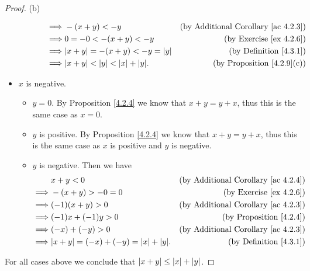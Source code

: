 \begin{proof}{(b)}
\begin{itemize}
\begin{itemize}
\begin{itemize}
\begin{align*}
                                      \implies & -(x + y) < -y                              & \text{(by Additional Corollary \ref{ac 4.2.3})} \\
                                      \implies & 0 = -0 < -(x + y) < -y                     & \text{(by Exercise \ref{ex 4.2.6})}             \\
                                      \implies & \abs{x + y} = -(x + y) < -y = \abs{y}      & \text{(by Definition \ref{4.3.1})}              \\
                                      \implies & \abs{x + y} < \abs{y} < \abs{x} + \abs{y}. & \text{(by Proposition \ref{4.2.9}(c))}
                                  \end{align*}
                        \end{itemize}
              \end{itemize}
        \item \(x\) is negative.
              \begin{itemize}
                  \item \(y = 0\).
                        By Proposition \ref{4.2.4} we know that \(x + y = y + x\), thus this is the same case as \(x = 0\).
                  \item \(y\) is positive.
                        By Proposition \ref{4.2.4} we know that \(x + y = y + x\), thus this is the same case as \(x\) is positive and \(y\) is negative.
                  \item \(y\) is negative.
                        Then we have
                        \begin{align*}
                                     & x + y < 0                                      & \text{(by Additional Corollary \ref{ac 4.2.4})} \\
                            \implies & -(x + y) > -0 = 0                              & \text{(by Exercise \ref{ex 4.2.6})}             \\
                            \implies & (-1)(x + y) > 0                                & \text{(by Additional Corollary \ref{ac 4.2.3})} \\
                            \implies & (-1)x + (-1)y > 0                              & \text{(by Proposition \ref{4.2.4})}             \\
                            \implies & (-x) + (-y) > 0                                & \text{(by Additional Corollary \ref{ac 4.2.3})} \\
                            \implies & \abs{x + y} = (-x) + (-y) = \abs{x} + \abs{y}. & \text{(by Definition \ref{4.3.1})}
                        \end{align*}
              \end{itemize}
    \end{itemize}
    For all cases above we conclude that \(\left\lvert x + y\right\rvert \leq \left\lvert x\right\rvert + \left\lvert y\right\rvert\).
\end{proof}

